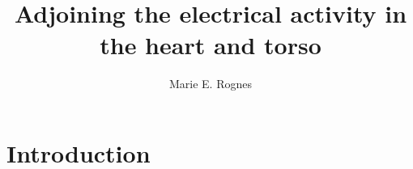 \documentclass[a4paper]{amsart}
\title{Adjoining the electrical activity in the heart and torso}
\author{Marie E. Rognes}
\numberwithin{equation}{section}
\begin{document}
\begin{abstract}
\end{abstract}

\maketitle

\renewcommand{\thefootnote}{\arabic{footnote}}



\section{Introduction}

%
%
\end{document}

